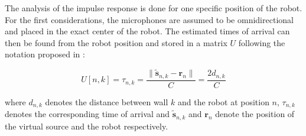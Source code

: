 The analysis of the impulse response is done for one specific position of the robot. For the first considerations, the microphones are assumed to be omnidirectional and placed in the exact center of the robot. 
The estimated times of arrival can then be found from the robot position and stored in a matrix $U$ following the notation proposed in \cite{Miranda}:

\begin{equation}
    U[n,k]=\tau_{n,k}=\frac{\| \tilde{\mathbf{s}}_{n,k}-\mathbf{r}_{n} \|}{C}=\frac{2d_{n,k}}{C}
    \label{eq:TOA}
\end{equation}

where $d_{n,k}$ denotes the distance between wall $k$ and the robot at position $n$, $\tau_{n,k}$ denotes the corresponding time of arrival and $\tilde{\mathbf{s}}_{n,k}$ and $\mathbf{r}_{n}$ denote the position of the virtual source and the robot respectively. 

